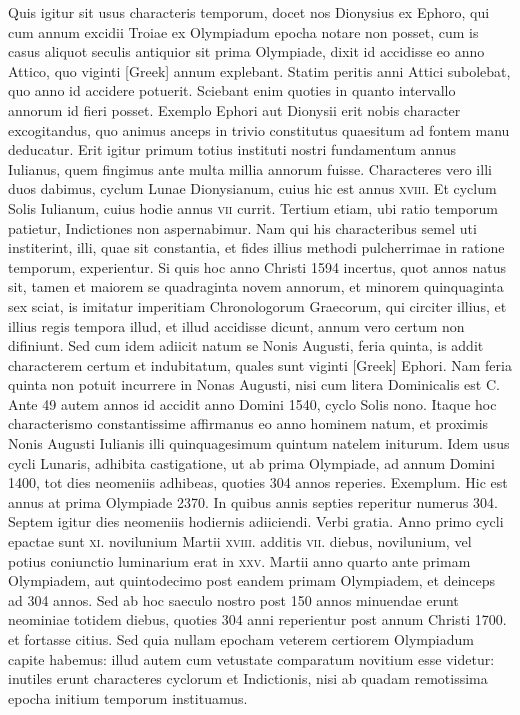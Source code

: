 Quis igitur sit usus characteris temporum, docet nos
Dionysius ex Ephoro, qui cum annum excidii Troiae ex Olympiadum
epocha notare non posset, cum is casus aliquot seculis antiquior
sit prima Olympiade, dixit id accidisse eo anno Attico, quo viginti
\textgreek{[Greek]} annum explebant.
Statim peritis anni Attici subolebat,
quo anno id accidere potuerit.
Sciebant enim quoties in quanto
intervallo annorum id fieri posset.
Exemplo Ephori aut Dionysii
erit nobis character excogitandus, quo animus anceps in trivio constitutus
quaesitum ad fontem manu deducatur.
Erit igitur primum
totius instituti nostri fundamentum annus Iulianus, quem fingimus
ante multa millia annorum fuisse.
Characteres vero illi duos dabimus,
cyclum Lunae Dionysianum, cuius hic est annus \textsc{xviii}.
Et cyclum
Solis Iulianum, cuius hodie annus \textsc{vii} currit.
Tertium etiam,
ubi ratio temporum patietur, Indictiones non aspernabimur.
Nam
qui his characteribus semel uti institerint, illi, quae sit constantia, et fides
illius methodi pulcherrimae in ratione temporum, experientur.
Si
quis hoc anno Christi 1594 incertus, quot annos natus sit, tamen et
maiorem se quadraginta novem annorum, et minorem quinquaginta
sex sciat, is imitatur imperitiam Chronologorum Graecorum, qui
circiter illius, et illius regis tempora illud, et illud accidisse dicunt, annum
vero certum non difiniunt.
Sed cum idem adiicit natum se Nonis
Augusti, feria quinta, is addit characterem certum et indubitatum,
quales sunt viginti \textgreek{[Greek]} Ephori.
Nam feria quinta non
potuit incurrere in Nonas Augusti, nisi cum litera Dominicalis est C.
Ante 49 autem annos id accidit anno Domini 1540, cyclo Solis nono.
Itaque hoc characterismo constantissime affirmanus eo anno hominem
natum, et proximis Nonis Augusti Iulianis illi quinquagesimum
quintum natelem initurum.
Idem usus cycli Lunaris, adhibita
castigatione, ut ab prima Olympiade, ad annum Domini 1400, tot
dies neomeniis adhibeas, quoties 304 annos reperies.
Exemplum.
Hic est annus at prima Olympiade 2370.
In quibus annis septies reperitur
numerus 304.
Septem igitur dies neomeniis hodiernis adiiciendi.
Verbi gratia.
Anno primo cycli epactae sunt \textsc{xi}. novilunium
Martii \textsc{xviii}. additis
 \textsc{vii}. diebus, novilunium, vel potius coniunctio
luminarium erat in \textsc{xxv}.
Martii anno quarto ante primam Olympiadem,
aut quintodecimo post eandem primam Olympiadem, et deinceps
ad 304 annos.
Sed ab hoc saeculo nostro post 150 annos minuendae
erunt neominiae totidem diebus, quoties 304 anni reperientur
post annum Christi 1700. et fortasse citius.
Sed quia nullam epocham
veterem certiorem Olympiadum capite habemus: illud autem
cum vetustate comparatum novitium esse videtur: inutiles erunt characteres
cyclorum et Indictionis, nisi ab quadam remotissima epocha
initium temporum instituamus.

